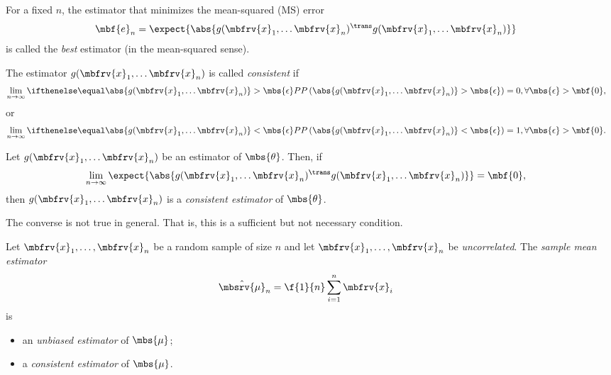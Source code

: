 \begin{mydefinition}
   For a fixed $n$, the estimator that minimizes the mean-squared (MS) error 
   \begin{align}
       \mbf{e}_{n} &= \expect{\abs{g(\mbfrv{x}_{1},\ldots\mbfrv{x}_{n})^{\trans}g(\mbfrv{x}_{1},\ldots\mbfrv{x}_{n})}}
   \end{align}
   is called the \emph{best} estimator (in the mean-squared sense).
\end{mydefinition}

\begin{mydefinition}[Consistency]
    The estimator $g(\mbfrv{x}_{1},\ldots\mbfrv{x}_{n})$ is called \emph{consistent} if 
    \begin{align}
        \lim_{n\to\infty} \prob{\abs{g(\mbfrv{x}_{1},\ldots\mbfrv{x}_{n})}>\mbs{\epsilon}} &= 0, \forall \mbs{\epsilon}>\mbf{0},
    \end{align}
    or
    \begin{align}
        \lim_{n\to\infty} \prob{\abs{g(\mbfrv{x}_{1},\ldots\mbfrv{x}_{n})}<\mbs{\epsilon}} &= 1, \forall \mbs{\epsilon}>\mbf{0}.
    \end{align}
\end{mydefinition}

\begin{mytheorem}
    Let $g(\mbfrv{x}_{1},\ldots\mbfrv{x}_{n})$ be an estimator of $\mbs{\theta}$. Then, if
    \begin{align}
        \lim_{n\to\infty} \expect{\abs{g(\mbfrv{x}_{1},\ldots\mbfrv{x}_{n})^{\trans}g(\mbfrv{x}_{1},\ldots\mbfrv{x}_{n})}} &= \mbf{0},
    \end{align}
    then $g(\mbfrv{x}_{1},\ldots\mbfrv{x}_{n})$ is a \emph{consistent estimator} of $\mbs{\theta}$.

    The converse is not true in general. That is, this is a sufficient but not necessary condition.
\end{mytheorem}


\begin{mytheorem}
     Let $\mbfrv{x}_{1},\ldots, \mbfrv{x}_{n}$ be a random sample of size $n$ and let $\mbfrv{x}_{1},\ldots, \mbfrv{x}_{n}$ be \emph{uncorrelated}. The \emph{sample mean estimator}
     \begin{align}
         \hat{\mbsrv{\mu}}_{n} &= \f{1}{n}\sum_{i=1}^{n}\mbfrv{x}_{i}
     \end{align}
     is
     \begin{itemize}
         \item an \emph{unbiased estimator} of $\mbs{\mu}$;
         \item a \emph{consistent estimator} of $\mbs{\mu}$.
     \end{itemize}
\end{mytheorem}

